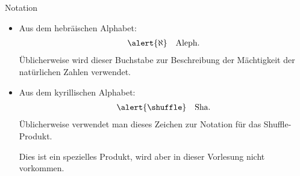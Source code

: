 \documentclass[german]{beamer}
\newcommand{\bq}{\begin{eqnarray*}}
\newcommand{\eq}{\end{eqnarray*}}
\begin{document}
\begin{frame}{Notation}

{\small
\begin{itemize}

\item Aus dem hebr\"aischen Alphabet:
\bq
 \alert{\aleph} && \mbox{Aleph}.
\eq
\"Ublicherweise wird dieser Buchstabe zur Beschreibung der M\"achtigkeit der nat\"urlichen Zahlen verwendet.

\item 
Aus dem kyrillischen Alphabet:
\bq
 \alert{\shuffle} & & \mbox{Sha}.
\eq
\"Ublicherweise verwendet man dieses Zeichen zur Notation f\"ur das Shuffle-Produkt.

Dies ist ein spezielles Produkt, wird aber in dieser Vorlesung nicht vorkommen.

\end{itemize}
}

\end{frame}
\end{document}
